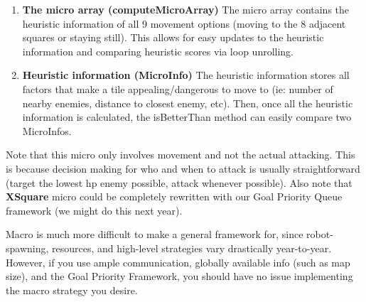 \begin{enumerate}
\begin{itemize}
\begin{enumerate}
          \item \textbf{The micro array (computeMicroArray)} The micro array contains the heuristic information of all 9 movement options (moving to the 8 adjacent squares or staying still). This allows for easy updates to the heuristic information and comparing heuristic scores via loop unrolling.
          \item \textbf{Heuristic information (MicroInfo)} The heuristic information stores all factors that make a tile appealing/dangerous to move to (ie: number of nearby enemies, distance to closest enemy, etc). Then, once all the heuristic information is calculated, the isBetterThan method can easily compare two MicroInfos. 
      \end{enumerate}
      Note that this micro only involves movement and not the actual attacking. This is because decision making for who and when to attack is usually straightforward (target the lowest hp enemy possible, attack whenever possible). Also note that \textbf{XSquare} micro could be completely rewritten with our Goal Priority Queue framework (we might do this next year).

      \medskip

      Macro is much more difficult to make a general framework for, since robot-spawning, resources, and high-level strategies vary drastically year-to-year. However, if you use ample communication, globally available info (such as map size), and the Goal Priority Framework, you should have no issue implementing the macro strategy you desire.


\end{itemize}
\end{enumerate}
